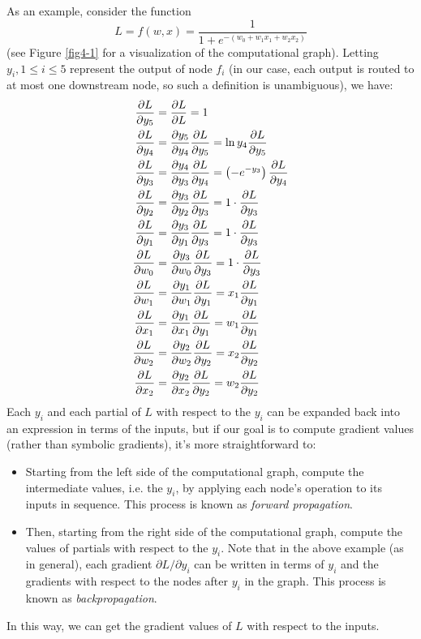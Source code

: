 As an example, consider the function
$$L = f(w, x) = \frac{1}{1 + e^{-\left(w_0 + w_1x_1 + w_2x_2\right)}}$$
(see Figure \ref{fig4-1} for a visualization of the computational graph). Letting $y_i, 1 \le i \le 5$ represent the output of node $f_i$ (in our case, each output is routed to at most one downstream node, so such a definition is unambiguous), we have:
\begin{align*}
    \frac{\partial L}{\partial y_5} &= \frac{\partial L}{\partial L} = 1\\
    \frac{\partial L}{\partial y_4} &= \frac{\partial y_5}{\partial y_4} \frac{\partial L}{\partial y_5} = \ln y_4 \frac{\partial L}{\partial y_5}\\
    \frac{\partial L}{\partial y_3} &= \frac{\partial y_4}{\partial y_3} \frac{\partial L}{\partial y_4} = \left(-e^{-y_3}\right)\frac{\partial L}{\partial y_4}\\
    \frac{\partial L}{\partial y_2} &= \frac{\partial y_3}{\partial y_2} \frac{\partial L}{\partial y_3} = 1 \cdot \frac{\partial L}{\partial y_3}\\
    \frac{\partial L}{\partial y_1} &= \frac{\partial y_3}{\partial y_1} \frac{\partial L}{\partial y_3} = 1 \cdot \frac{\partial L}{\partial y_3}\\
    \frac{\partial L}{\partial w_0} &= \frac{\partial y_3}{\partial w_0} \frac{\partial L}{\partial y_3} = 1 \cdot \frac{\partial L}{\partial y_3}\\
    \frac{\partial L}{\partial w_1} &= \frac{\partial y_1}{\partial w_1} \frac{\partial L}{\partial y_1} = x_1\frac{\partial L}{\partial y_1}\\
    \frac{\partial L}{\partial x_1} &= \frac{\partial y_1}{\partial x_1} \frac{\partial L}{\partial y_1} = w_1\frac{\partial L}{\partial y_1}\\
    \frac{\partial L}{\partial w_2} &= \frac{\partial y_2}{\partial w_2} \frac{\partial L}{\partial y_2} = x_2\frac{\partial L}{\partial y_2}\\
    \frac{\partial L}{\partial x_2} &= \frac{\partial y_2}{\partial x_2} \frac{\partial L}{\partial y_2} = w_2\frac{\partial L}{\partial y_2}\\
\end{align*}
Each $y_i$ and each partial of $L$ with respect to the $y_i$ can be expanded back into an expression in terms of the inputs, but if our goal is to compute gradient values (rather than symbolic gradients), it's more straightforward to:
\begin{itemize}
    \item Starting from the left side of the computational graph, compute the intermediate values, i.e. the $y_i$, by applying each node's operation to its inputs in sequence. This process is known as \emph{forward propagation}.
    \item Then, starting from the right side of the computational graph, compute the values of partials with respect to the $y_i$. Note that in the above example (as in general), each gradient $\partial L / \partial y_i$ can be written in terms of $y_i$ and the gradients with respect to the nodes after $y_i$ in the graph. This process is known as \emph{backpropagation}.
\end{itemize}
In this way, we can get the gradient values of $L$ with respect to the inputs.

